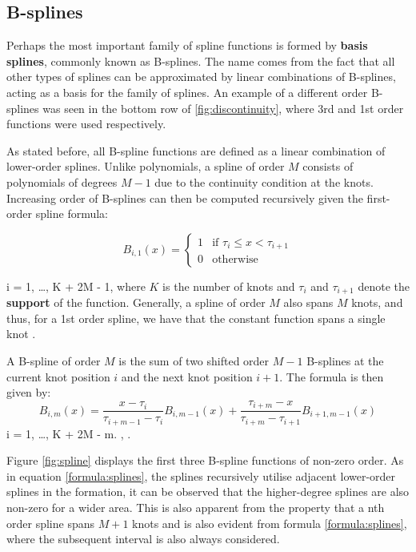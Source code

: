 \subsection{B-splines}

Perhaps the most important family of spline functions is formed by \textbf{basis splines}, commonly known as B-splines. The name comes from the fact that all other types of splines can be approximated by linear combinations of B-splines, acting as a basis for the family of splines.\cite[87-93]{practicalguidetosplines} An example of a different order B-splines was seen in the bottom row of \ref{fig:discontinuity}, where 3rd and 1st order functions were used respectively.

As stated before, all B-spline functions are defined as a linear combination of lower-order splines. Unlike polynomials, a spline of order $M$ consists of polynomials of degrees $M-1$ due to the continuity condition at the knots. Increasing order of B-splines can then be computed recursively given the first-order spline formula:

\begin{equation}
B_{i,1}(x) = 
\begin{cases} 
1 & \text{if } \tau_i \leq x < \tau_{i+1} \\
0 & \text{otherwise}
\end{cases}
\end{equation}

 i = 1, \ldots, K + 2M - 1, where $K$ is the number of knots and $\tau_i$ and $\tau_{i+1}$ denote the \textbf{support} of the function. Generally, a spline of order $M$ also spans $M$ knots, and thus, for a 1st order spline, we have that the constant function spans a single knot \cite[186-189]{HastieTrevor2009EoSL}.

A B-spline of order $M$ is the sum of two shifted order $M-1$ B-splines at the current knot position $i$ and the next knot position $i+1$. The formula is then given by: 
\begin{equation}
\label{formula:splines}
B_{i,m}(x) = \frac{x - \tau_i}{\tau_{i+m-1} - \tau_i} B_{i,m-1}(x) + \frac{\tau_{i+m} - x}{\tau_{i+m} - \tau_{i+1}} B_{i+1,m-1}(x)
\end{equation}
 i = 1, \ldots, K + 2M - m. \cite[186-189]{HastieTrevor2009EoSL}, \cite[90]{practicalguidetosplines}.

Figure \ref{fig:spline} displays the first three B-spline functions of non-zero order. As in equation \ref{formula:splines}, the splines recursively utilise adjacent lower-order splines in the formation, it can be observed that the higher-degree splines are also non-zero for a wider area. This is also apparent from the property that a nth order spline spans $M+1$ knots and is also evident from formula \ref{formula:splines}, where the subsequent interval is also always considered.

